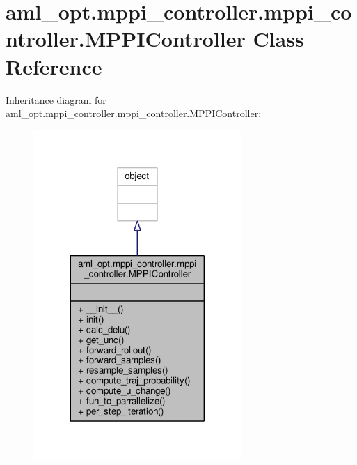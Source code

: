 \hypertarget{classaml__opt_1_1mppi__controller_1_1mppi__controller_1_1_m_p_p_i_controller}{\section{aml\-\_\-opt.\-mppi\-\_\-controller.\-mppi\-\_\-controller.\-M\-P\-P\-I\-Controller Class Reference}
\label{classaml__opt_1_1mppi__controller_1_1mppi__controller_1_1_m_p_p_i_controller}
}


Inheritance diagram for aml\-\_\-opt.\-mppi\-\_\-controller.\-mppi\-\_\-controller.\-M\-P\-P\-I\-Controller\-:
\nopagebreak
\begin{figure}[H]
\begin{center}
\leavevmode
\includegraphics[width=224pt]{classaml__opt_1_1mppi__controller_1_1mppi__controller_1_1_m_p_p_i_controller__inherit__graph}
\end{center}
\end{figure}


